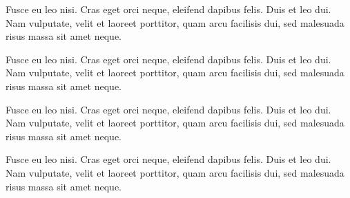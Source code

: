 \documentclass[a4paper,UKenglish,numberwithinsect,cleveref,thm-restate]{lipics-v2021}
\begin{document}
\begin{note*}
Fusce eu leo nisi. Cras eget orci neque, eleifend dapibus felis. Duis et leo dui. Nam vulputate, velit et laoreet porttitor, quam arcu facilisis dui, sed malesuada risus massa sit amet neque.
\end{note*}

\begin{claim}\label{testenv-claim}
Fusce eu leo nisi. Cras eget orci neque, eleifend dapibus felis. Duis et leo dui. Nam vulputate, velit et laoreet porttitor, quam arcu facilisis dui, sed malesuada risus massa sit amet neque.
\end{claim}

\begin{claim*}\label{testenv-claim2}
Fusce eu leo nisi. Cras eget orci neque, eleifend dapibus felis. Duis et leo dui. Nam vulputate, velit et laoreet porttitor, quam arcu facilisis dui, sed malesuada risus massa sit amet neque.
\end{claim*}

\begin{claimproof}
Fusce eu leo nisi. Cras eget orci neque, eleifend dapibus felis. Duis et leo dui. Nam vulputate, velit et laoreet porttitor, quam arcu facilisis dui, sed malesuada risus massa sit amet neque.
\end{claimproof}
\end{document}
